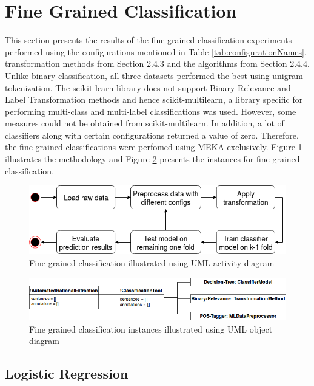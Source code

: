 \documentclass[a4paper,12pt,twoside]{report}
\begin{document}
\section{Fine Grained Classification}
This section presents the results of the fine grained classification experiments performed using the configurations mentioned in Table \ref{tab:configurationNames}, transformation methods from Section 2.4.3 and the algorithms from Section 2.4.4. Unlike  binary classification, all three datasets performed the best using unigram tokenization. The scikit-learn library does not support Binary Relevance and Label Transformation methods and hence scikit-multilearn, a library specific for performing multi-class and multi-label classifications was used. However, some measures could not be obtained from scikit-multilearn. In addition, a lot of classifiers along with certain configurations returned a value of zero. Therefore, the fine-grained classifications were perfomed using MEKA exclusively. Figure \ref{fig:finegrainedClass} illustrates the methodology and Figure \ref{fig:instanceFine} presents the instances for fine grained classification. 

\begin{figure}[h] %
    \centering
    \includegraphics[width=12cm]{fine-grained-classification}
    \caption{Fine grained classification illustrated using UML activity diagram}
    \label{fig:finegrainedClass}
\end{figure}

\begin{figure}[h] %
    \centering
    \includegraphics[width=13cm]{fine-object-diagram}
    \caption{Fine grained classification instances illustrated using UML object diagram}
    \label{fig:instanceFine}
\end{figure}

\subsection{Logistic Regression}
\end{document}
